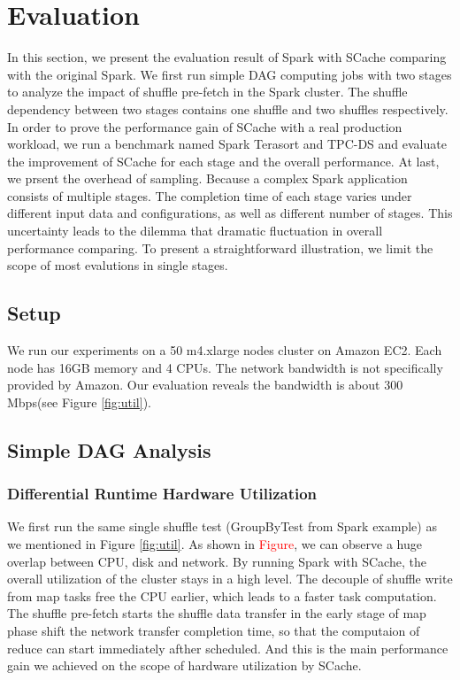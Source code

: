 \section{Evaluation}\label{evaluation}

In this section, we present the evaluation result of Spark with SCache comparing with the original Spark. We first run simple DAG computing jobs with two stages to analyze the impact of shuffle pre-fetch in the Spark cluster. The shuffle dependency between two stages contains one shuffle and two shuffles respectively. In order to prove the performance gain of SCache with a real production workload, we run a benchmark named Spark Terasort\cite{spark-tera} and TPC-DS\cite{tpcds} and evaluate the improvement of SCache for each stage and the overall performance. At last, we prsent the overhead of sampling. Because a complex Spark application consists of multiple stages. The completion time of each stage varies under different input data and configurations, as well as different number of stages. This uncertainty leads to the dilemma that dramatic fluctuation in overall performance comparing. To present a straightforward illustration, we limit the scope of most evalutions in single stages. 

\subsection{Setup}\label{stepup}
We run our experiments on a 50 m4.xlarge nodes cluster on Amazon EC2\cite{aws}. Each node has 16GB memory and 4 CPUs. The network bandwidth is not specifically provided by Amazon. Our evaluation reveals the bandwidth is about 300 Mbps(see Figure \ref{fig:util}).

\subsection{Simple DAG Analysis}

\subsubsection{Differential Runtime Hardware Utilization} 
We first run the same single shuffle test (GroupByTest from Spark example\cite{sparksource}) as we mentioned in Figure \ref{fig:util}. As shown in \textcolor{red}{Figure}, we can observe a huge overlap between CPU, disk and network. By running Spark with SCache, the overall utilization of the cluster stays in a high level. The decouple of shuffle write from map tasks free the CPU earlier, which leads to a faster task computation. The shuffle pre-fetch starts the shuffle data transfer in the early stage of map phase shift the network transfer completion time, so that the computaion of reduce can start immediately afther scheduled. And this is the main performance gain we achieved on the scope of hardware utilization by SCache.

